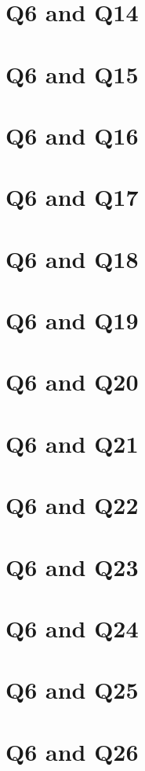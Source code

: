 \documentclass{report}
\begin{document}
\section{Q6 and Q14}\clearpage
\section{Q6 and Q15}\clearpage
\section{Q6 and Q16}\clearpage
\section{Q6 and Q17}\clearpage
\section{Q6 and Q18}\clearpage
\section{Q6 and Q19}\clearpage
\section{Q6 and Q20}\clearpage
\section{Q6 and Q21}\clearpage
\section{Q6 and Q22}\clearpage
\section{Q6 and Q23}\clearpage
\section{Q6 and Q24}\clearpage
\section{Q6 and Q25}\clearpage
\section{Q6 and Q26}\clearpage
\end{document}
